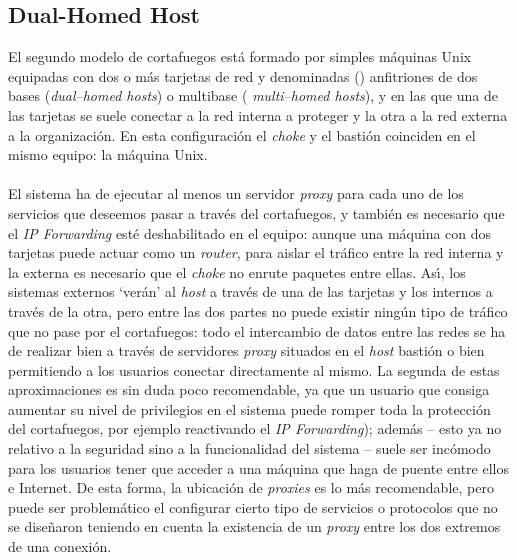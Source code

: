 \subsection{Dual-Homed Host}
El segundo modelo de cortafuegos est\'a formado por simples m\'aquinas Unix 
equipadas con dos o m\'as tarjetas de red y denominadas (\cite{kn:siy95}) 
anfitriones de dos bases ({\it dual--homed hosts}) o multibase ({\it 
multi--homed hosts}), y en las que una de las tarjetas se suele conectar a la 
red interna a proteger y la otra a la red externa a la organizaci\'on. En esta
configuraci\'on el {\it choke} y el basti\'on coinciden en el mismo equipo: la
m\'aquina Unix.\\
\\El sistema ha de ejecutar al menos un servidor {\it proxy} para cada
uno de los servicios que deseemos pasar a trav\'es del cortafuegos, y tambi\'en
es necesario que el {\it IP Forwarding} est\'e deshabilitado en el equipo: 
aunque una m\'aquina con dos tarjetas puede actuar como un {\it router}, para
aislar el tr\'afico entre la red interna y la externa es necesario que el {\it 
choke} no enrute paquetes entre ellas. As\'{\i}, los sistemas externos 
`ver\'an' al
{\it host} a trav\'es de una de las tarjetas y los internos a trav\'es de la
otra, pero entre las dos partes no puede existir ning\'un tipo de tr\'afico que
no pase por el cortafuegos: todo el intercambio de datos entre las
redes se ha de realizar bien a trav\'es de servidores {\it proxy} situados en 
el {\it host} basti\'on o bien permitiendo a los usuarios conectar directamente
al mismo. La segunda de estas aproximaciones es sin duda poco recomendable,
ya que un usuario que consiga aumentar su nivel de privilegios en el sistema 
puede romper toda la protecci\'on del cortafuegos, por ejemplo reactivando el 
{\it IP Forwarding}); adem\'as -- esto ya no relativo a la seguridad sino a la
funcionalidad del sistema -- suele ser inc\'omodo para los usuarios tener que
acceder a una m\'aquina que haga de puente entre ellos e Internet. De esta 
forma, la ubicaci\'on de {\it proxies} es lo m\'as recomendable, pero puede ser
problem\'atico el configurar cierto tipo de servicios o protocolos que no se
dise\~naron teniendo en cuenta la existencia de un {\it proxy} entre los dos
extremos de una conexi\'on.
